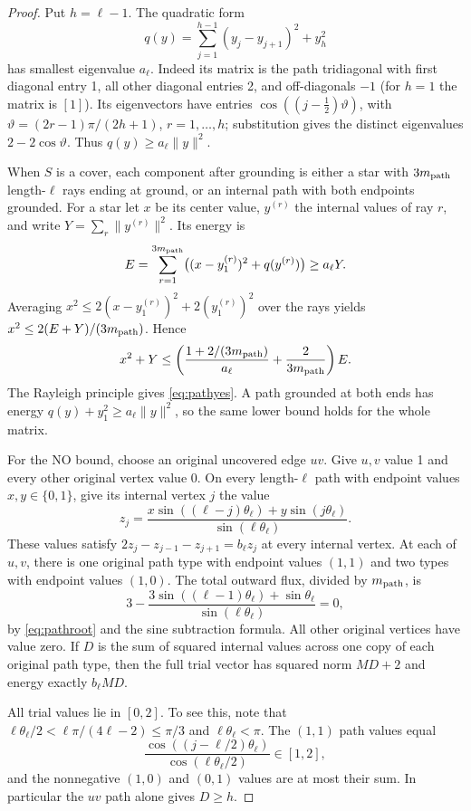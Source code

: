 \begin{proof}
Put $h=\ell-1$. The quadratic form
\[
 q(y)=\sum_{j=1}^{h-1}(y_j-y_{j+1})^2+y_h^2
\]
has smallest eigenvalue $a_\ell$. Indeed its matrix is the path
tridiagonal with first diagonal entry 1, all other diagonal entries
2, and off-diagonals $-1$ (for $h=1$ the matrix is $[1]$).
Its eigenvectors have entries $\cos((j-\tfrac12)\vartheta)$,
with $\vartheta=(2r-1)\pi/(2h+1)$, $r=1,\ldots,h$;
substitution gives the distinct eigenvalues $2-2\cos\vartheta$.
Thus $q(y)\geq a_\ell\|y\|^2$.

When $S$ is a cover, each component after grounding is either a
star with $3m_{\rm path}$ length-$\ell$ rays ending at ground, or an internal
path with both endpoints grounded. For a star let $x$ be its center
value, $y^{(r)}$ the internal values of ray $r$, and write
$Y=\sum_r\|y^{(r)}\|^2$. Its energy is
\[
 E=\sum_{r=1}^{3m_{\rm path}}\bigl((x-y^{(r)}_1)^2+q(y^{(r)})\bigr)
 \geq a_\ell Y.
\]
Averaging $x^2\leq2(x-y^{(r)}_1)^2+2(y^{(r)}_1)^2$ over the
rays yields $x^2\leq2(E+Y)/(3m_{\rm path})$. Hence
\[
 x^2+Y\leq\left(\frac{1+2/(3m_{\rm path})}{a_\ell}+
                    \frac2{3m_{\rm path}}\right)E.
\]
The Rayleigh principle gives \eqref{eq:pathyes}. A path grounded
at both ends has energy $q(y)+y_1^2\geq a_\ell\|y\|^2$,
so the same lower bound holds for the whole matrix.

For the NO bound, choose an original uncovered edge $uv$.
Give $u,v$ value 1 and every other original vertex value 0.
On every length-$\ell$ path with endpoint values $x,y\in\{0,1\}$,
give its internal vertex $j$ the value
\begin{equation}\label{eq:pathtrial}
 z_j=\frac{x\sin((\ell-j)\theta_\ell)
               +y\sin(j\theta_\ell)}{\sin(\ell\theta_\ell)}.
\end{equation}
These values satisfy
$2z_j-z_{j-1}-z_{j+1}=b_\ell z_j$ at every internal vertex.
At each of $u,v$, there is one original path type with endpoint
values $(1,1)$ and two types with endpoint values $(1,0)$.
The total outward flux, divided by $m_{\rm path}$, is
\[
 3-\frac{3\sin((\ell-1)\theta_\ell)+\sin\theta_\ell}
             {\sin(\ell\theta_\ell)}=0,
\]
by \eqref{eq:pathroot} and the sine subtraction formula.
All other original vertices have value zero. If $D$ is the sum of
squared internal values across one copy of each original path type,
then the full trial vector has squared norm $MD+2$ and energy
exactly $b_\ell MD$.

All trial values lie in $[0,2]$. To see this, note that
$\ell\theta_\ell/2<\ell\pi/(4\ell-2)\leq\pi/3$ and
$\ell\theta_\ell<\pi$. The $(1,1)$ path values equal
\[
 \frac{\cos((j-\ell/2)\theta_\ell)}
      {\cos(\ell\theta_\ell/2)}\in[1,2],
\]
and the nonnegative $(1,0)$ and $(0,1)$ values are at most their
sum. In particular the $uv$ path alone gives $D\geq h$.


\end{proof}
